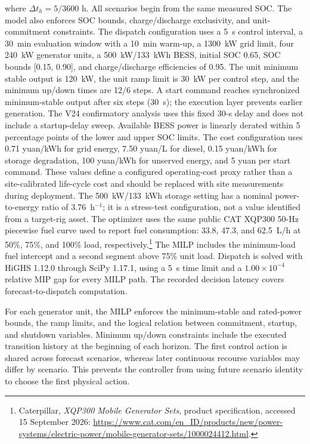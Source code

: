 where $\Delta t_h=5/3600$ h. All scenarios begin from the same measured SOC.
The model also enforces SOC bounds, charge/discharge exclusivity, and unit-
commitment constraints. The dispatch configuration uses a 5~s control interval,
a 30~min evaluation window with a 10~min warm-up, a 1300~kW grid limit,
four 240~kW generator units, a 500~kW/133~kWh BESS, initial SOC 0.65, SOC
bounds [0.15, 0.90], and charge/discharge efficiencies of 0.95. The unit
minimum stable output is 120~kW, the unit ramp limit is 30~kW per control
step, and the minimum up/down times are 12/6 steps. A start command reaches
synchronized minimum-stable output after six steps (30~s); the execution layer
prevents earlier generation. The V24 confirmatory analysis uses this fixed
30-s delay and does not include a startup-delay sweep. Available BESS power is
linearly derated within 5 percentage points of
the lower and upper SOC limits. The cost configuration
uses 0.71 yuan/kWh for grid energy, 7.50 yuan/L for
diesel, 0.15 yuan/kWh for storage degradation, 100 yuan/kWh for unserved
energy, and 5 yuan per start command. These values define a configured
operating-cost proxy rather than a site-calibrated life-cycle cost and should
be replaced with site measurements during deployment. The 500~kW/133~kWh
storage setting has a nominal power-to-energy ratio of 3.76~h$^{-1}$; it is a
stress-test configuration, not a value identified from a target-rig asset. The
optimizer uses the same public CAT XQP300 50-Hz piecewise fuel curve used to
report fuel consumption: 33.8, 47.3, and 62.5~L/h at 50\%, 75\%, and 100\%
load, respectively.\footnote{Caterpillar, \emph{XQP300 Mobile Generator Sets},
product specification, accessed 15 September 2026:
\url{https://www.cat.com/en_ID/products/new/power-systems/electric-power/mobile-generator-sets/1000024412.html}.}
The MILP includes the minimum-load fuel intercept and a second segment above
75\% unit load. Dispatch is
solved with HiGHS 1.12.0 through SciPy 1.17.1, using a 5~s time limit and a
$1.00\times10^{-4}$ relative MIP gap for every MILP path. The recorded decision latency covers
forecast-to-dispatch computation.

For each generator unit, the MILP enforces the minimum-stable and rated-power
bounds, the ramp limits, and the logical relation between commitment,
startup, and shutdown variables. Minimum up/down constraints include the
executed transition history at the beginning of each horizon. The first
control action is shared across forecast scenarios, whereas later
continuous recourse variables may differ by scenario. This prevents the
controller from using future scenario identity to choose the first physical
action.

